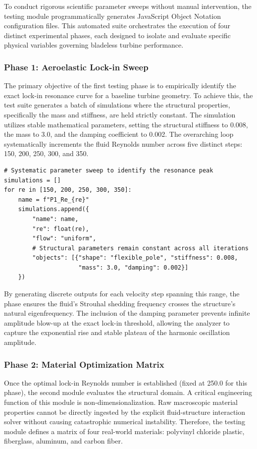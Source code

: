 \documentclass[11pt,a4paper]{article}
\begin{document}
To conduct rigorous scientific parameter sweeps without manual intervention, the testing module programmatically generates JavaScript Object Notation configuration files. This automated suite orchestrates the execution of four distinct experimental phases, each designed to isolate and evaluate specific physical variables governing bladeless turbine performance. 

\subsubsection{Phase 1: Aeroelastic Lock-in Sweep}
The primary objective of the first testing phase is to empirically identify the exact lock-in resonance curve for a baseline turbine geometry. To achieve this, the test suite generates a batch of simulations where the structural properties, specifically the mass and stiffness, are held strictly constant. The simulation utilizes stable mathematical parameters, setting the structural stiffness to 0.008, the mass to 3.0, and the damping coefficient to 0.002. The overarching loop systematically increments the fluid Reynolds number across five distinct steps: 150, 200, 250, 300, and 350. 

\begin{lstlisting}[style=pystyle]
# Systematic parameter sweep to identify the resonance peak
simulations = []
for re in [150, 200, 250, 300, 350]:
    name = f"P1_Re_{re}"
    simulations.append({
        "name": name,
        "re": float(re),
        "flow": "uniform",
        # Structural parameters remain constant across all iterations
        "objects": [{"shape": "flexible_pole", "stiffness": 0.008, 
                     "mass": 3.0, "damping": 0.002}]
    })
\end{lstlisting}

By generating discrete outputs for each velocity step spanning this range, the phase ensures the fluid's Strouhal shedding frequency crosses the structure's natural eigenfrequency. The inclusion of the damping parameter prevents infinite amplitude blow-up at the exact lock-in threshold, allowing the analyzer to capture the exponential rise and stable plateau of the harmonic oscillation amplitude.

\subsubsection{Phase 2: Material Optimization Matrix}
Once the optimal lock-in Reynolds number is established (fixed at 250.0 for this phase), the second module evaluates the structural domain. A critical engineering function of this module is non-dimensionalization. Raw macroscopic material properties cannot be directly ingested by the explicit fluid-structure interaction solver without causing catastrophic numerical instability. Therefore, the testing module defines a matrix of four real-world materials: polyvinyl chloride plastic, fiberglass, aluminum, and carbon fiber. 
\end{document}
